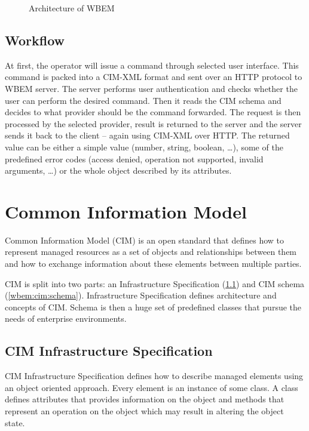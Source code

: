\begin{figure}[H]
  \centering
  
  \caption{Architecture of WBEM}
  \label{fig:wbem-arch}
\end{figure}

\subsection{Workflow}
\label{wbem:architecture:workflow}

At first, the operator will issue a command through selected user interface.
This command is packed into a CIM-XML format and sent over an HTTP protocol to
WBEM server. The server performs user authentication and checks whether the user
can perform the desired command. Then it reads the CIM schema and decides to
what provider should be the command forwarded. The request is then processed by
the selected provider, result is returned to the server and the server sends it
back to the client -- again using CIM-XML over HTTP. The returned value can be
either a simple value (number, string, boolean, \ldots), some of the predefined
error codes (access denied, operation not supported, invalid arguments, \ldots)
or the whole object described by its attributes.

\section{Common Information Model}
\label{wbem:cim}

Common Information Model (CIM) is an open standard that defines how to represent
managed resources as a set of objects and relationships between them and how to
exchange information about these elements between multiple parties.

CIM is split into two parts: an Infrastructure Specification
(\ref{wbem:cim:is}) and CIM schema (\ref{wbem:cim:schema}).
Infrastructure Specification defines architecture and concepts of CIM. Schema
is then a huge set of predefined classes that pursue the needs of enterprise
environments.

\subsection{CIM Infrastructure Specification}
\label{wbem:cim:is}

CIM Infrastructure Specification defines how to describe managed elements using
an object oriented approach. Every element is an instance of some class. A class
defines attributes that provides information on the object and methods that
represent an operation on the object which may result in altering the object
state.

